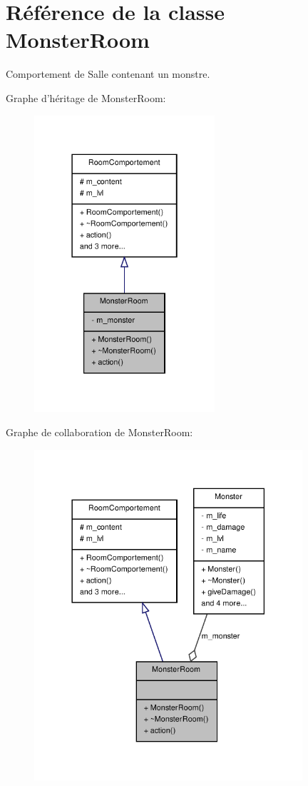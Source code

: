 \hypertarget{class_monster_room}{\section{Référence de la classe Monster\-Room}
\label{class_monster_room}
}


Comportement de Salle contenant un monstre.  




Graphe d'héritage de Monster\-Room\-:
\nopagebreak
\begin{figure}[H]
\begin{center}
\leavevmode
\includegraphics[width=190pt]{class_monster_room__inherit__graph}
\end{center}
\end{figure}


Graphe de collaboration de Monster\-Room\-:
\nopagebreak
\begin{figure}[H]
\begin{center}
\leavevmode
\includegraphics[width=282pt]{class_monster_room__coll__graph}
\end{center}
\end{figure}
